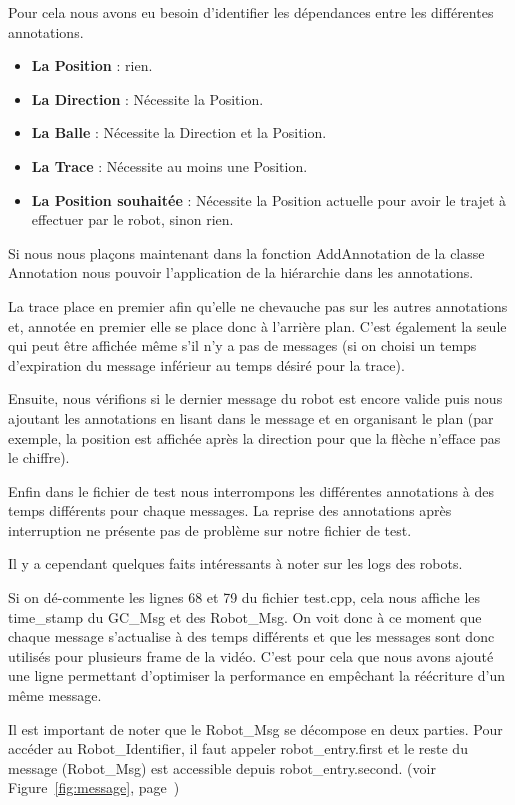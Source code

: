 Pour cela nous avons eu besoin d'identifier les dépendances entre les différentes annotations.

\begin{itemize}
    \item \textbf{La Position }: rien.
    \item \textbf{La Direction }: Nécessite la Position.
    \item \textbf{La Balle }: Nécessite la Direction et la Position.
    \item \textbf{La Trace }: Nécessite au moins une Position.
    \item \textbf{La Position souhaitée } : Nécessite la Position actuelle pour avoir le trajet à effectuer par le robot, sinon rien.
\end{itemize}
\bigskip

Si nous nous plaçons maintenant dans la fonction AddAnnotation de la classe Annotation nous pouvoir l'application de la hiérarchie dans les annotations.

La trace place en premier afin qu'elle ne chevauche pas sur les autres annotations et, annotée en premier elle se place donc à l'arrière plan.
C'est également la seule qui peut être affichée même s'il n'y a pas de messages (si on choisi un temps d'expiration du message inférieur au temps désiré pour la trace).
\bigskip

Ensuite, nous vérifions si le dernier message du robot est encore valide puis nous ajoutant les annotations en lisant dans le message et en organisant le plan (par exemple, la position est affichée après la direction pour que la flèche n'efface pas le chiffre).
\bigskip

Enfin dans le fichier de test nous interrompons les différentes annotations à des temps différents pour chaque messages. La reprise des annotations après interruption ne présente pas de problème sur notre fichier de test.
\bigskip 

Il y a cependant quelques faits intéressants à noter sur les logs des robots.
\bigskip

Si on dé-commente les lignes 68 et 79 du fichier test.cpp, cela nous affiche les time\_stamp du GC\_Msg et des Robot\_Msg.
On voit donc à ce moment que chaque message s'actualise à des temps différents et que les messages sont donc utilisés pour plusieurs frame de la vidéo. C'est pour cela que nous avons ajouté une ligne permettant d'optimiser la performance en empêchant la réécriture d'un même message.
\bigskip

Il est important de noter que le Robot\_Msg se décompose en deux parties. Pour accéder au Robot\_Identifier, il faut appeler robot\_entry.first et le reste du message (Robot\_Msg) est accessible depuis robot\_entry.second. (voir Figure~\ref{fig:message}, page~\pageref{fig:message})

